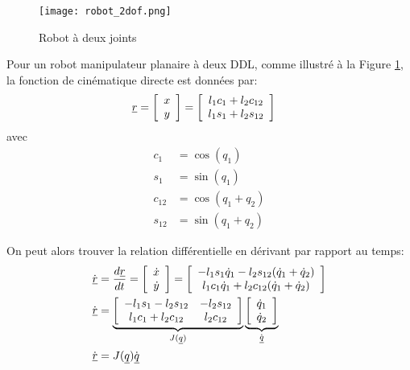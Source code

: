 \begin{example}

\label{sec:kindiff_2dof}

\begin{figure}[H]
	\centering
		\texttt{[image: robot\_2dof.png]}
	\caption{Robot à deux joints}
	\label{fig:robot_2dof}
\end{figure}

Pour un robot manipulateur planaire à deux DDL, comme illustré à la Figure \ref{fig:robot_2dof}, la fonction de cinématique directe est données par:
\begin{align}
\underline{r} &= \left[ \begin{array}{c} x \\ y  \end{array} \right]  = \left[ \begin{array}{c} 
 l_1 c_1 + l_2 c_{12} \\ 
 l_1 s_1 + l_2 s_{12}  
\end{array} \right] 
\label{eq:kinfwd2dof}
\end{align} 
avec
\begin{align}
c_1    &= \cos( q_1 ) \\
s_1    &= \sin( q_1 ) \\
c_{12} &= \cos( q_1 + q_2 ) \\
s_{12} &= \sin( q_1 + q_2 )
\end{align} 

On peut alors trouver la relation différentielle en dérivant par rapport au temps:
\begin{align}
\dot{\underline{r}} &= \frac{d\underline{r}}{dt} = \left[ \begin{array}{c} \dot{x} \\ \dot{y}  \end{array} \right]  = \left[ \begin{array}{c} 
-l_1 s_1 \dot{q}_1 - l_2 s_{12}( \dot{q}_1 + \dot{q}_2 ) \\ 
 l_1 c_1 \dot{q}_1 + l_2 c_{12}( \dot{q}_1 + \dot{q}_2 )  
\end{array} \right] \\
\dot{\underline{r}}  &= 
\underbrace{ \left[ \begin{array}{c c } 
-l_1 s_1 - l_2 s_{12} & - l_2 s_{12} \\ 
 l_1 c_1 + l_2 c_{12} &   l_2 c_{12}
\end{array} \right]  }_{ J(\underline{q}) } 
\underbrace{ \left[ \begin{array}{c} 
\dot{q}_1 \\ 
\dot{q}_2 
\end{array} \right]}_{ \dot{\underline{q}} } \\
\dot{\underline{r}}  &= J(\underline{q}) \dot{\underline{q}}
\end{align} 
\end{example}

